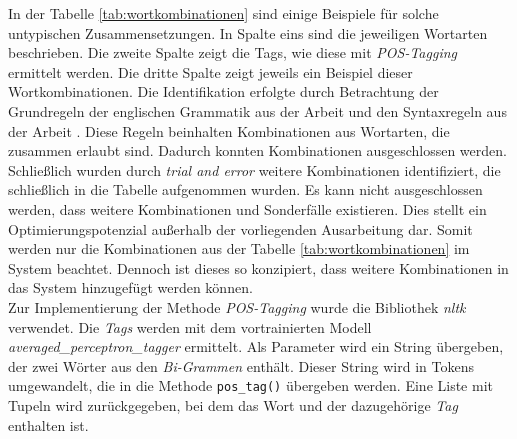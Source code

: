 In der Tabelle \ref{tab:wortkombinationen} sind einige Beispiele für solche untypischen Zusammensetzungen. In Spalte eins sind die jeweiligen Wortarten beschrieben. Die zweite Spalte zeigt die Tags, wie diese mit \emph{POS-Tagging} ermittelt werden. Die dritte Spalte zeigt jeweils ein Beispiel dieser Wortkombinationen. Die Identifikation erfolgte durch Betrachtung der Grundregeln der englischen Grammatik aus der Arbeit \cite{ogden1930basic} und den Syntaxregeln aus der Arbeit \cite{tayal2014syntax}. Diese Regeln beinhalten Kombinationen aus Wortarten, die zusammen erlaubt sind. Dadurch konnten Kombinationen ausgeschlossen werden. Schließlich wurden durch \emph{trial and error} weitere Kombinationen identifiziert, die schließlich in die Tabelle aufgenommen wurden. Es kann nicht ausgeschlossen werden, dass weitere Kombinationen und Sonderfälle existieren. Dies stellt ein Optimierungspotenzial außerhalb der vorliegenden Ausarbeitung dar. Somit werden nur die Kombinationen aus der Tabelle \ref{tab:wortkombinationen} im System beachtet. Dennoch ist dieses so konzipiert, dass weitere Kombinationen in das System hinzugefügt werden können.\\

Zur Implementierung der Methode \emph{POS-Tagging} wurde die Bibliothek \emph{nltk} verwendet. Die \emph{Tags} werden mit dem vortrainierten Modell \emph{averaged\_perceptron\_tagger} ermittelt.
Als Parameter wird ein String übergeben, der zwei Wörter aus den \emph{Bi-Grammen} enthält. Dieser String wird in Tokens umgewandelt, die in die Methode \lstinline{pos_tag()}
übergeben werden. Eine Liste mit Tupeln wird zurückgegeben, bei dem das Wort und der dazugehörige \emph{Tag} enthalten ist.
